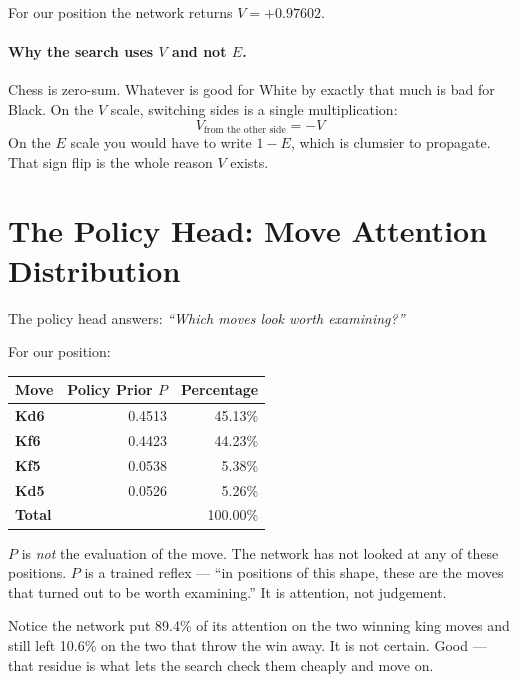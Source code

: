 For our position the network returns \textbf{$V = +0.97602$}.

\begin{center}

\label{fig:wdl}
\end{center}

\begin{center}

\label{fig:sharp}
\end{center}

\paragraph{Why the search uses $V$ and not $E$.}
Chess is zero-sum. Whatever is good for White by exactly that much is bad for Black. On the $V$ scale, switching sides is a single multiplication:
\begin{equation}
  V_{\text{from the other side}} = -V
\end{equation}
On the $E$ scale you would have to write $1 - E$, which is clumsier to propagate. That sign flip is the whole reason $V$ exists.

\section{The Policy Head: Move Attention Distribution}

The policy head answers: \textit{``Which moves look worth examining?''}

For our position:
\begin{center}
\begin{tabular}{lrr}
  \toprule
  Move & Policy Prior $P$ & Percentage \\
  \midrule
  \textbf{Kd6} & 0.4513 & 45.13\% \\
  \textbf{Kf6} & 0.4423 & 44.23\% \\
  \textbf{Kf5} & 0.0538 & 5.38\% \\
  \textbf{Kd5} & 0.0526 & 5.26\% \\
  \midrule
  \textbf{Total} & & 100.00\% \\
  \bottomrule
\end{tabular}
\end{center}

\begin{established}
$P$ is \textit{not} the evaluation of the move. The network has not looked at any of these positions. $P$ is a trained reflex --- ``in positions of this shape, these are the moves that turned out to be worth examining.'' It is attention, not judgement.
\end{established}

Notice the network put 89.4\% of its attention on the two winning king moves and still left 10.6\% on the two that throw the win away. It is not certain. Good --- that residue is what lets the search check them cheaply and move on.
